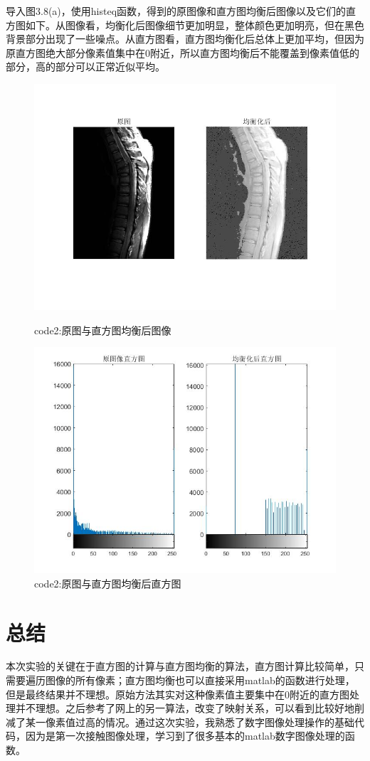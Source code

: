 \documentclass{article}
\begin{document}
	导入图3.8(a)，使用histeq函数，得到的原图像和直方图均衡后图像以及它们的直方图如下。从图像看，均衡化后图像细节更加明显，整体颜色更加明亮，但在黑色背景部分出现了一些噪点。从直方图看，直方图均衡化后总体上更加平均，但因为原直方图绝大部分像素值集中在0附近，所以直方图均衡后不能覆盖到像素值低的部分，高的部分可以正常近似平均。
	\begin{figure}[H]
		\centering
		\begin{minipage}{0.49\linewidth}
			\centering
			\includegraphics[width=0.9\linewidth]{figures/test1.JPG}
			\caption{code2:原图与直方图均衡后图像}
		\end{minipage}
		\begin{minipage}{0.49\linewidth}
			\centering
			\includegraphics[width=0.9\linewidth]{figures/test2.JPG}
			\caption{code2:原图与直方图均衡后直方图}
		\end{minipage}
	\end{figure}
	\section{总结}
	本次实验的关键在于直方图的计算与直方图均衡的算法，直方图计算比较简单，只需要遍历图像的所有像素；直方图均衡也可以直接采用matlab的函数进行处理，但是最终结果并不理想。原始方法其实对这种像素值主要集中在0附近的直方图处理并不理想。之后参考了网上的另一算法，改变了映射关系，可以看到比较好地削减了某一像素值过高的情况。通过这次实验，我熟悉了数字图像处理操作的基础代码，因为是第一次接触图像处理，学习到了很多基本的matlab数字图像处理的函数。
\end{document}
